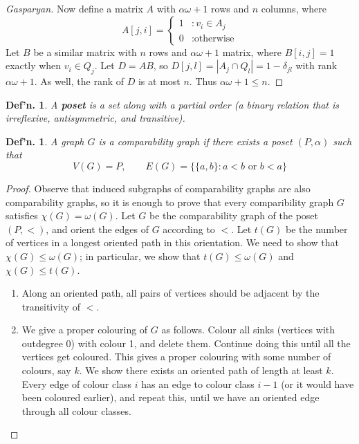 \documentclass[12pt, a4paper]{book}
\newtheorem{definition}[theorem]{Def'n.}
\theoremstyle{nonumberplain}
\newtheorem{proof}{Proof}
\begin{document}
\begin{proof}[Gasparyan]
    Now define a matrix $A$ with $\alpha\omega+1$ rows and $n$ columns, where
    \[A[j,i]=
        \begin{cases}
            1 &: v_i\in A_j\\
            0 &:\text{otherwise}
        \end{cases}
    \]
    Let $B$ be a similar matrix with $n$ rows and $\alpha\omega+1$ matrix, where $B[i,j]=1$ exactly when $v_i\in Q_j$.
    Let $D=AB$, so $D[j,l]=|A_j\cap Q_l|=1-\delta_{jl}$ with rank $\alpha\omega+1$.
    As well, the rank of $D$ is at most $n$.
    Thus $\alpha\omega+1\leq n$.
\end{proof}
\begin{definition}
    A \textbf{poset} is a set along with a partial order (a binary relation that is irreflexive, antisymmetric, and transitive).
\end{definition}
\begin{definition}
    A graph $G$ is a comparability graph if there exists a poset $(P,\alpha)$ such that
    \[V(G)=P,\qquad E(G)=\{\{a,b\}:a<b\text{ or }b<a\}\]
\end{definition}
\begin{proof}
    Observe that induced subgraphs of comparability graphs are also comparability graphs, so it is enough to prove that every comparibility graph $G$ satisfies $\chi(G)=\omega(G)$.
    Let $G$ be the comparability graph of the poset $(P,<)$, and orient the edges of $G$ according to $<$.
    Let $t(G)$ be the number of vertices in a longest oriented path in this orientation.
    We need to show that $\chi(G)\leq\omega(G)$; in particular, we show that $t(G)\leq\omega(G)$ and $\chi(G)\leq t(G)$.
    \begin{enumerate}[nolistsep]
        \item Along an oriented path, all pairs of vertices should be adjacent by the transitivity of $<$.
        \item We give a proper colouring of $G$ as follows.
            Colour all sinks (vertices with outdegree 0) with colour 1, and delete them.
            Continue doing this until all the vertices get coloured.
            This gives a proper colouring with some number of colours, say $k$.
            We show there exists an oriented path of length at least $k$.
            Every edge of colour class $i$ has an edge to colour class $i-1$ (or it would have been coloured earlier), and repeat this, until we have an oriented edge through all colour classes.
    \end{enumerate}
\end{proof}
\end{document}
